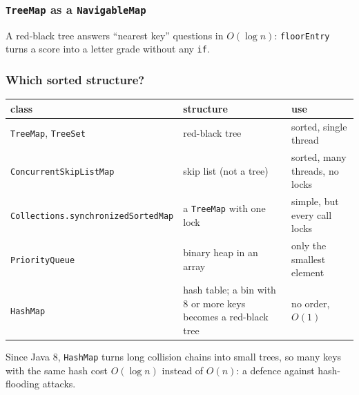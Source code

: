 \documentclass[aspectratio=169,10pt,compress]{beamer}
\begin{document}




\begin{frame}[t,fragile] \frametitle{\texttt{TreeMap} as a \texttt{NavigableMap}}

  \vspace{0.2em}
  \small A red-black tree answers ``nearest key'' questions in $O(\log n)$: \texttt{floorEntry} turns a score into a letter grade without any \texttt{if}.
\end{frame}




\begin{frame}[t,fragile] \frametitle{Which sorted structure?}
  \begin{center}\small
  \begin{tabular}{L{0.38\textwidth}L{0.3\textwidth}L{0.22\textwidth}}
    \toprule
    \textbf{class}                    & \textbf{structure}                    & \textbf{use} \\
    \midrule
    \texttt{TreeMap}, \texttt{TreeSet} & red-black tree                       & sorted, single thread \\
    \texttt{ConcurrentSkipListMap}    & skip list (not a tree)                & sorted, many threads, no locks \\
    \texttt{Collections.synchronizedSortedMap} & a \texttt{TreeMap} with one lock & simple, but every call locks \\
    \texttt{PriorityQueue}            & binary heap in an array               & only the smallest element \\
    \texttt{HashMap}                  & hash table; a bin with 8 or more keys becomes a red-black tree & no order, $O(1)$ \\
    \bottomrule
  \end{tabular}
  \end{center}
  \small Since Java 8, \texttt{HashMap} turns long collision chains into small trees, so many keys with the same hash cost $O(\log n)$ instead of $O(n)$: a defence against hash-flooding attacks.
\end{frame}
\end{document}
